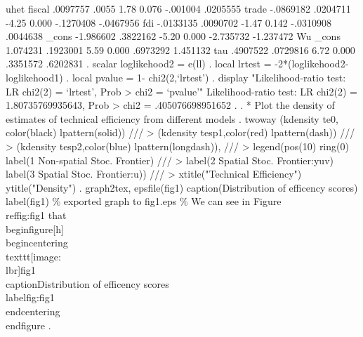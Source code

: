 uhet         {\VBAR}
      fiscal {\VBAR}   .0097757      .0055     1.78   0.076     -.001004    .0205555
       trade {\VBAR}  -.0869182   .0204711    -4.25   0.000    -.1270408   -.0467956
         fdi {\VBAR}  -.0133135   .0090702    -1.47   0.142    -.0310908    .0044638
       _cons {\VBAR}  -1.986602   .3822162    -5.20   0.000    -2.735732   -1.237472
Wu           {\VBAR}
       _cons {\VBAR}   1.074231   .1923001     5.59   0.000     .6973292    1.451132
         tau {\VBAR}   .4907522   .0729816     6.72   0.000     .3351572    .6202831
{\smallskip}
. scalar loglikehood2 =  e(ll)
{\smallskip}
. local lrtest = -2*(loglikehood2-loglikehood1)
{\smallskip}
. local pvalue = 1- chi2(2,`lrtest')
{\smallskip}
. display "Likelihood-ratio test: LR chi2(2) = `lrtest', Prob > chi2 = `pvalue'"
Likelihood-ratio test: LR chi2(2) = 1.80735769935643, Prob > chi2 = .405076698951652
{\smallskip}
. 
. * Plot the density of estimates of technical efficiency from different models
. twoway (kdensity te0, color(black) lpattern(solid)) ///
>        (kdensity tesp1,color(red) lpattern(dash))   ///
>            (kdensity tesp2,color(blue) lpattern(longdash)),  ///
>            legend(pos(10) ring(0) label(1 Non-spatial Stoc. Frontier) ///
>            label(2 Spatial Stoc. Frontier:yuv) label(3 Spatial Stoc. Frontier:u)) ///
>            xtitle("Technical Efficiency") ytitle("Density")
{\smallskip}
. graph2tex, epsfile(fig1) caption(Distribution of efficency scores) label(fig1)
\% exported graph to fig1.eps
\% We can see in Figure \\ref{\lbr}fig:fig1{\rbr} that
\\begin{\lbr}figure{\rbr}[h]
\\begin{\lbr}centering{\rbr}
  \\texttt{[image: \\lbr]}fig1{\rbr}
  \\caption{\lbr}Distribution of efficency scores{\rbr}
  \\label{\lbr}fig:fig1{\rbr}
\\end{\lbr}centering{\rbr}
\\end{\lbr}figure{\rbr}
{\smallskip}
. 
